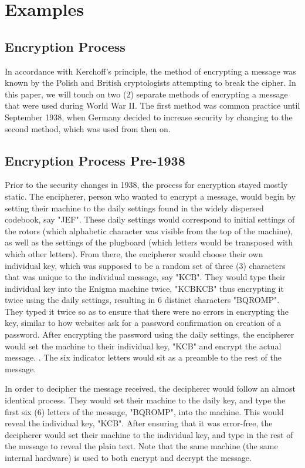 \chapter{Examples}\label{chap:examples}

\section{Encryption Process}

In accordance with Kerchoff's principle, the method of encrypting a message was known by the Polish and British cryptologists attempting to break the cipher. In this paper, we will touch on two (2) separate methods of encrypting a message that were used during World War II. The first method was common practice until September 1938, when Germany decided to increase security by changing to the second method, which was used from then on.

\section{Encryption Process Pre-1938}\label{sec:encprocess1938}

Prior to the security changes in 1938, the process for encryption stayed mostly static. The encipherer, person who wanted to encrypt a message, would begin by setting their machine to the daily settings found in the widely dispersed codebook, say "JEF". These daily settings would correspond to initial settings of the rotors (which alphabetic character was visible from the top of the machine), as well as the settings of the plugboard (which letters would be transposed with which other letters). From there, the encipherer would choose their own individual key, which was supposed to be a random set of three (3) characters that was unique to the individual message, say "KCB". They would type their individual key into the Enigma machine twice, "KCBKCB" thus encrypting it twice using the daily settings, resulting in 6 distinct characters "BQROMP". They typed it twice so as to ensure that there were no errors in encrypting the key, similar to how websites ask for a password confirmation on creation of a password. After encrypting the password using the daily settings, the encipherer would set the machine to their individual key, "KCB" and encrypt the actual message. \cite{wt06}. The six indicator letters would sit as a preamble to the rest of the message. 

In order to decipher the message received, the decipherer would follow an almost identical process. They would set their machine to the daily key, and type the first six (6) letters of the message, "BQROMP", into the machine. This would reveal the individual key, "KCB". After ensuring that it was error-free, the decipherer would set their machine to the individual key, and type in the rest of the message to reveal the plain text. Note that the same machine (the same internal hardware) is used to both encrypt and decrypt the message.

